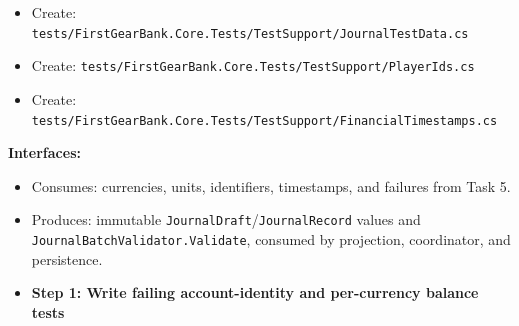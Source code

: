 \documentclass[
  10pt,
  letterpaper,
]{article}
\newcommand{\passthrough}[1]{#1}
\providecommand{\tightlist}{%
  \setlength{\itemsep}{0pt}\setlength{\parskip}{0pt}}
\begin{document}
\begin{itemize}
\item
  Create:
  \texttt{tests/}\allowbreak{}\texttt{FirstGearBank.}\allowbreak{}\texttt{Core.}\allowbreak{}\texttt{Tests/}\allowbreak{}\texttt{TestSupport/}\allowbreak{}\texttt{JournalTestData.}\allowbreak{}\texttt{cs}
\item
  Create:
  \texttt{tests/}\allowbreak{}\texttt{FirstGearBank.}\allowbreak{}\texttt{Core.}\allowbreak{}\texttt{Tests/}\allowbreak{}\texttt{TestSupport/}\allowbreak{}\texttt{PlayerIds.}\allowbreak{}\texttt{cs}
\item
  Create:
  \texttt{tests/}\allowbreak{}\texttt{FirstGearBank.}\allowbreak{}\texttt{Core.}\allowbreak{}\texttt{Tests/}\allowbreak{}\texttt{TestSupport/}\allowbreak{}\texttt{FinancialTimestamps.}\allowbreak{}\texttt{cs}
\end{itemize}

\textbf{Interfaces:}

\begin{itemize}
\tightlist
\item
  Consumes: currencies, units, identifiers, timestamps, and failures
  from Task 5.
\item
  Produces: immutable
  \passthrough{\lstinline!JournalDraft!}/\passthrough{\lstinline!JournalRecord!}
  values and
  \texttt{JournalBatchValidator.}\allowbreak{}\texttt{Validate},
  consumed by projection, coordinator, and persistence.
\end{itemize}

\begin{itemize}
\tightlist
\item[$\square$]
  \textbf{Step 1: Write failing account-identity and per-currency
  balance tests}
\end{itemize}
\end{document}
